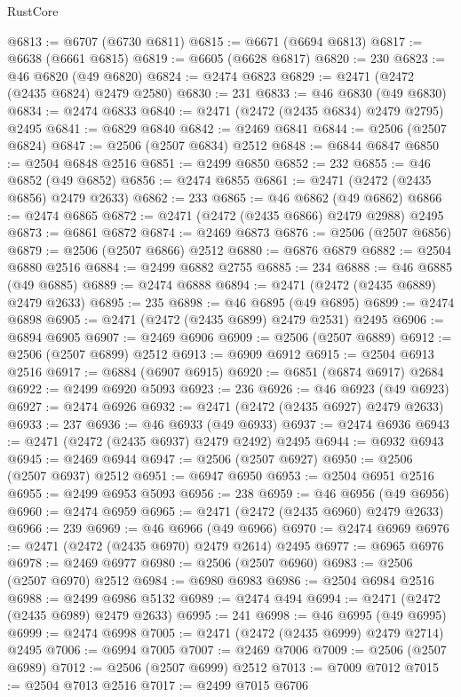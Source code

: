 \begin{lexlean}{RustCore}
\begin{coremodule}
@6813 := @6707 (@6730 @6811)
@6815 := @6671 (@6694 @6813)
@6817 := @6638 (@6661 @6815)
@6819 := @6605 (@6628 @6817)
@6820 := 230
@6823 := @46 @6820 (@49 @6820)
@6824 := @2474 @6823
@6829 := @2471 (@2472 (@2435 @6824) @2479 @2580)
@6830 := 231
@6833 := @46 @6830 (@49 @6830)
@6834 := @2474 @6833
@6840 := @2471 (@2472 (@2435 @6834) @2479 @2795) @2495
@6841 := @6829 @6840
@6842 := @2469 @6841
@6844 := @2506 (@2507 @6824)
@6847 := @2506 (@2507 @6834) @2512
@6848 := @6844 @6847
@6850 := @2504 @6848 @2516
@6851 := @2499 @6850
@6852 := 232
@6855 := @46 @6852 (@49 @6852)
@6856 := @2474 @6855
@6861 := @2471 (@2472 (@2435 @6856) @2479 @2633)
@6862 := 233
@6865 := @46 @6862 (@49 @6862)
@6866 := @2474 @6865
@6872 := @2471 (@2472 (@2435 @6866) @2479 @2988) @2495
@6873 := @6861 @6872
@6874 := @2469 @6873
@6876 := @2506 (@2507 @6856)
@6879 := @2506 (@2507 @6866) @2512
@6880 := @6876 @6879
@6882 := @2504 @6880 @2516
@6884 := @2499 @6882 @2755
@6885 := 234
@6888 := @46 @6885 (@49 @6885)
@6889 := @2474 @6888
@6894 := @2471 (@2472 (@2435 @6889) @2479 @2633)
@6895 := 235
@6898 := @46 @6895 (@49 @6895)
@6899 := @2474 @6898
@6905 := @2471 (@2472 (@2435 @6899) @2479 @2531) @2495
@6906 := @6894 @6905
@6907 := @2469 @6906
@6909 := @2506 (@2507 @6889)
@6912 := @2506 (@2507 @6899) @2512
@6913 := @6909 @6912
@6915 := @2504 @6913 @2516
@6917 := @6884 (@6907 @6915)
@6920 := @6851 (@6874 @6917) @2684
@6922 := @2499 @6920 @5093
@6923 := 236
@6926 := @46 @6923 (@49 @6923)
@6927 := @2474 @6926
@6932 := @2471 (@2472 (@2435 @6927) @2479 @2633)
@6933 := 237
@6936 := @46 @6933 (@49 @6933)
@6937 := @2474 @6936
@6943 := @2471 (@2472 (@2435 @6937) @2479 @2492) @2495
@6944 := @6932 @6943
@6945 := @2469 @6944
@6947 := @2506 (@2507 @6927)
@6950 := @2506 (@2507 @6937) @2512
@6951 := @6947 @6950
@6953 := @2504 @6951 @2516
@6955 := @2499 @6953 @5093
@6956 := 238
@6959 := @46 @6956 (@49 @6956)
@6960 := @2474 @6959
@6965 := @2471 (@2472 (@2435 @6960) @2479 @2633)
@6966 := 239
@6969 := @46 @6966 (@49 @6966)
@6970 := @2474 @6969
@6976 := @2471 (@2472 (@2435 @6970) @2479 @2614) @2495
@6977 := @6965 @6976
@6978 := @2469 @6977
@6980 := @2506 (@2507 @6960)
@6983 := @2506 (@2507 @6970) @2512
@6984 := @6980 @6983
@6986 := @2504 @6984 @2516
@6988 := @2499 @6986 @5132
@6989 := @2474 @494
@6994 := @2471 (@2472 (@2435 @6989) @2479 @2633)
@6995 := 241
@6998 := @46 @6995 (@49 @6995)
@6999 := @2474 @6998
@7005 := @2471 (@2472 (@2435 @6999) @2479 @2714) @2495
@7006 := @6994 @7005
@7007 := @2469 @7006
@7009 := @2506 (@2507 @6989)
@7012 := @2506 (@2507 @6999) @2512
@7013 := @7009 @7012
@7015 := @2504 @7013 @2516
@7017 := @2499 @7015 @6706

\end{coremodule}
\end{lexlean}
